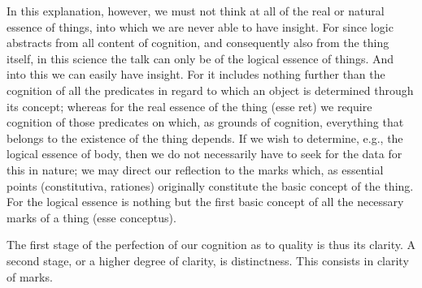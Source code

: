     In this explanation, however, we must not think at all of
    the real or natural essence of things,
    into which we are never able to have insight.
    For since logic abstracts from all content of cognition, and
    consequently also from the thing itself, in this science
    the talk can only be of the logical essence of things.
    And into this we can easily have insight.
    For it includes nothing further than the cognition of
    all the predicates in regard to which
    an object is determined through its concept;
    whereas for the real essence of the thing (esse ret)
    we require cognition of those predicates on which,
    as grounds of cognition, everything that belongs
    to the existence of the thing depends.
    If we wish to determine, e.g., the logical essence of body, then
    we do not necessarily have to seek for the data for this in nature;
    we may direct our reflection to the marks which, as essential points
    (constitutiva, rationes) originally constitute the basic concept of the thing.
    For the logical essence is nothing but the first basic concept of
    all the necessary marks of a thing (esse conceptus).

    The first stage of the perfection of our cognition
    as to quality is thus its clarity.
    A second stage, or a higher degree of clarity, is distinctness.
    This consists in clarity of marks.

